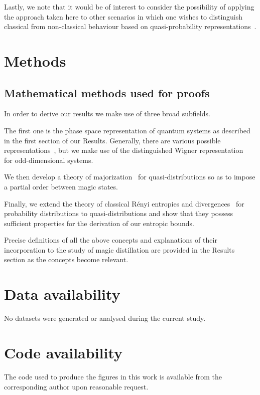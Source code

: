 \documentclass[
onecolumn,
superscriptaddress
]{revtex4-1}
\begin{document}
Lastly, we note that it would be of interest to consider the possibility of applying the approach taken here to other scenarios in which one wishes to distinguish classical from non-classical behaviour based on quasi-probability representations~\cite{Ferrie_2008, barnett_1997,Allahverdyan_2018, arvidsson_2020, halpern_2018, Lostaglio_2018, Levy_2020}.

\section*{Methods}

\subsection*{Mathematical methods used for proofs}

In order to derive our results we make use of three broad subfields.

The first one is the phase space representation of quantum systems as described in the first section of our Results.
Generally, there are various possible representations~\cite{Ferrie_2008}, but we make use of the distinguished Wigner representation~\cite{Gross2006} for odd-dimensional systems.

We then develop a theory of majorization~\cite{cit:marshall,  Veinott_1971, Ruch_1976} for quasi-distributions so as to impose a partial order between magic states.

Finally, we extend the theory of classical R\'{e}nyi entropies and divergences~\cite{renyi_1960} for probability distributions to quasi-distributions and show that they possess sufficient properties for the derivation of our entropic bounds. 

Precise definitions of all the above concepts and explanations of their incorporation to the study of magic distillation are provided in the Results section as the concepts become relevant.

\section*{Data availability}
No datasets were generated or analysed during the current study.

\section*{Code availability}
The code used to produce the figures in this work is available from the corresponding author upon reasonable request.
\end{document}
